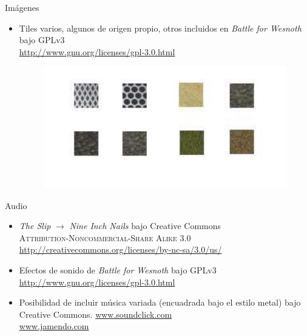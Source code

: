 \documentclass[9pt,xcolor=svgnames]{beamer}
\begin{document}
  
  
  \begin{frame}{Imágenes}
   
   \begin{itemize}	  
    \item Tiles varios, algunos de origen propio, otros incluidos en
	  \textit{Battle for Wesnoth} bajo GPLv3\\
	  \url{http://www.gnu.org/licenses/gpl-3.0.html}
	  
	  \begin{figure}[t]
	   \includegraphics[scale=0.5]{./Imagenes/tiles.pdf}
	  \end{figure}
	  
   \end{itemize}
   
  \end{frame}
  
  
  \begin{frame}{Audio}
   \begin{itemize}
    \item \textit{The Slip} $\longrightarrow$ \textit{Nine Inch Nails}
	  bajo Creative Commons\\
	  \textsc{Attribution-Noncommercial-Share Alike 3.0}\\
	  \url{http://creativecommons.org/licenses/by-nc-sa/3.0/us/}\\
	  
    \item Efectos de sonido de \textit{Battle for Wesnoth} bajo GPLv3\\
	  \url{http://www.gnu.org/licenses/gpl-3.0.html}\\
	  
    \item Posibilidad de incluir música variada (encuadrada bajo el
	  estilo metal) bajo Creative Commons.
	  \url{www.soundclick.com}\\
	  \url{www.jamendo.com}
   \end{itemize}
  \end{frame}
  
\end{document}
